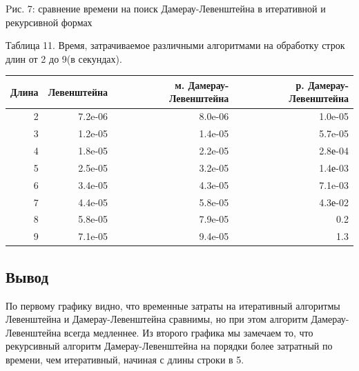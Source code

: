 \documentclass[a4paper, 14pt]{article}
\begin{document}
\begin{center}

\begin{center}
Pис. 7: сравнение времени на поиск Дамерау-Левенштейна в итеративной и рекурсивной формах
\end{center}
\begin{center}
        
      \begin{center}
      \newpage
  	Таблица 11. Время, затрачиваемое различными алгоритмами на обработку строк длин от 2 до 9(в секундах).
	\end{center}
	    \begin{tabular}{ | r | r | r | r | }
        \hline
Длина & Левенштейна & м. Дамерау-Левенштейна & р. Дамерау-Левенштейна \\ \hline
2 & 7.2e-06 & 8.0e-06 & 1.0e-05\\
3 & 1.2e-05 & 1.4e-05 & 5.7e-05\\
4 & 1.8e-05 & 2.2e-05 & 2.8е-04\\
5 & 2.5e-05 & 3.2e-05 & 1.4е-03\\
6 & 3.4e-05 & 4.3e-05 & 7.1e-03\\
7 & 4.4e-05 & 5.8e-05 & 4.3е-02\\
8 & 5.8e-05 & 7.9e-05 & 0.2\\
9 & 7.1e-05 & 9.4e-05 & 1.3\\
\hline
        \end{tabular}

\end{center}
	\begin{flushleft}
	\begin{center}
	\subsection{Вывод}
	\end{center}	
	По первому графику видно, что временные затраты на итеративный алгоритмы Левенштейна и Дамерау-Левенштейна сравнимы, но при этом алгоритм Дамерау-Левенштейна всегда медленнее. Из второго графика мы замечаем то, что рекурсивный алгоритм Дамерау-Левенштейна на порядки более затратный по времени, чем итеративный, начиная с длины строки в 5.
	\end{flushleft}
        
    \end{center}
\end{document}
